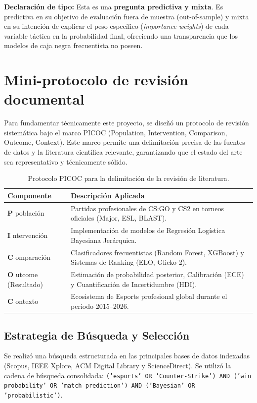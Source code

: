 \documentclass[12pt,a4paper]{article}
\begin{document}
\vspace{1em}
\noindent \textbf{Declaración de tipo:} Esta es una \textbf{pregunta predictiva y mixta}. Es predictiva en su objetivo de evaluación fuera de muestra (out-of-sample) y mixta en su intención de explicar el peso específico (\textit{importance weights}) de cada variable táctica en la probabilidad final, ofreciendo una transparencia que los modelos de caja negra frecuentista no poseen.

\section{Mini-protocolo de revisión documental}

Para fundamentar técnicamente este proyecto, se diseñó un protocolo de revisión sistemática bajo el marco PICOC (Population, Intervention, Comparison, Outcome, Context). Este marco permite una delimitación precisa de las fuentes de datos y la literatura científica relevante, garantizando que el estado del arte sea representativo y técnicamente sólido.

\begin{table}[H]
\centering
\begin{tabular}{|l|p{10cm}|}
\hline
\textbf{Componente} & \textbf{Descripción Aplicada} \\ \hline
\textbf{P} población & Partidas profesionales de CS:GO y CS2 en torneos oficiales (Major, ESL, BLAST). \\ \hline
\textbf{I} ntervención & Implementación de modelos de Regresión Logística Bayesiana Jerárquica. \\ \hline
\textbf{C} omparación & Clasificadores frecuentistas (Random Forest, XGBoost) y Sistemas de Ranking (ELO, Glicko-2). \\ \hline
\textbf{O} utcome (Resultado) & Estimación de probabilidad posterior, Calibración (ECE) y Cuantificación de Incertidumbre (HDI). \\ \hline
\textbf{C} ontexto & Ecosistema de Esports profesional global durante el periodo 2015--2026. \\ \hline
\end{tabular}
\caption{Protocolo PICOC para la delimitación de la revisión de literatura.}
\label{tab:picoc}
\end{table}

\subsection{Estrategia de Búsqueda y Selección}
Se realizó una búsqueda estructurada en las principales bases de datos indexadas (Scopus, IEEE Xplore, ACM Digital Library y ScienceDirect). Se utilizó la cadena de búsqueda consolidada: \texttt{('esports' OR 'Counter-Strike') AND ('win probability' OR 'match prediction') AND ('Bayesian' OR 'probabilistic')}.
\end{document}
